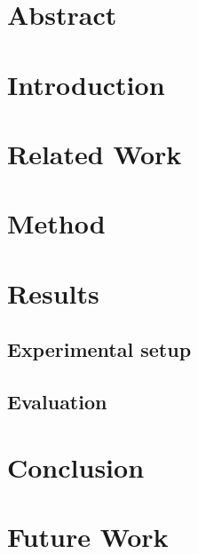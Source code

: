 \documentclass[a4paper, 12pt]{article}
\begin{document}


\setcounter{page}{2}
\tableofcontents
\newpage

\listoftodos
\section*{Abstract}


\section{Introduction}


% 

\section{Related Work}


\section{Method}


\section{Results}
\subsection{Experimental setup}
\subsection{Evaluation}
\section{Conclusion}
\section{Future Work}

\printbibliography
\end{document}
